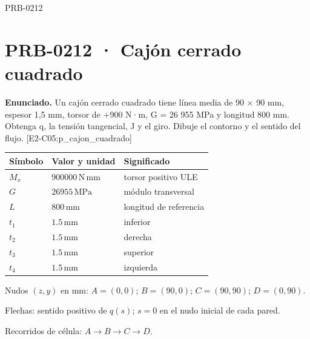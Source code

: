 \begin{studiumworked}{PRB-0212}

\section{PRB-0212 · Cajón cerrado cuadrado}

\textbf{Enunciado.} Un cajón cerrado cuadrado tiene línea media de 90 \ensuremath{\times} 90 mm, espesor 1,5 mm, torsor de +900 N·m, G = 26 955 MPa y longitud 800 mm. Obtenga q, la tensión tangencial, J y el giro. Dibuje el contorno y el sentido del flujo. [E2-C05:p\_cajon\_cuadrado]

\par\medskip\noindent\begin{tabular}{@{}p{.18\linewidth}p{.26\linewidth}p{.48\linewidth}@{}}
\toprule Símbolo & Valor y unidad & Significado\\\midrule
$M_{x}$ & $900000\,\mathrm{N\,mm}$ & torsor positivo ULE\\
$G$ & $26955\,\mathrm{MPa}$ & módulo transversal\\
$L$ & $800\,\mathrm{mm}$ & longitud de referencia\\
$t_{1}$ & $1.5\,\mathrm{mm}$ & inferior\\
$t_{2}$ & $1.5\,\mathrm{mm}$ & derecha\\
$t_{3}$ & $1.5\,\mathrm{mm}$ & superior\\
$t_{4}$ & $1.5\,\mathrm{mm}$ & izquierda\\
\bottomrule\end{tabular}\par\medskip

\par\medskip\noindent\begin{minipage}{\linewidth}\centering
{}
\par\small Nudos $(z,y)$ en mm: $A=(0,0)$; $B=(90,0)$; $C=(90,90)$; $D=(0,90)$.
\par\small Flechas: sentido positivo de $q(s)$; $s=0$ en el nudo inicial de cada pared.
\par\small Recorridos de célula: $A\to B\to C\to D$.
\par\normalsize\end{minipage}\par\medskip


\end{studiumworked}
